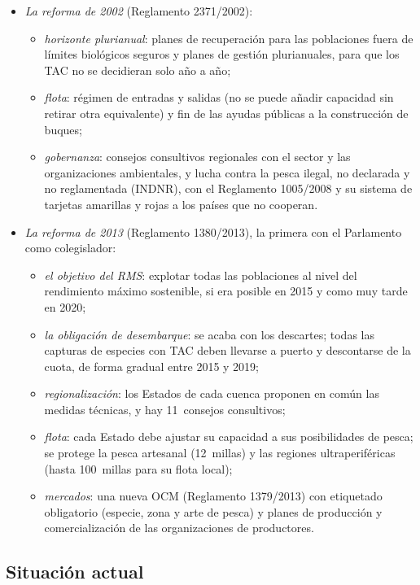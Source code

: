 \documentclass[11pt]{article}
\begin{document}
\begin{itemize}
\item \emph{La reforma de 2002} (Reglamento 2371/2002)\nocite{UE2002PPC}:
  \begin{itemize}
  \item \emph{horizonte plurianual}: planes de recuperación para las poblaciones fuera de límites biológicos seguros y planes de gestión plurianuales, para que los TAC no se decidieran solo año a año;
  \item \emph{flota}: régimen de entradas y salidas (no se puede añadir capacidad sin retirar otra equivalente) y fin de las ayudas públicas a la construcción de buques;
  \item \emph{gobernanza}: consejos consultivos regionales con el sector y las organizaciones ambientales, y lucha contra la pesca ilegal, no declarada y no reglamentada (INDNR), con el Reglamento 1005/2008 y su sistema de tarjetas amarillas y rojas a los países que no cooperan.
  \end{itemize}
\item \emph{La reforma de 2013} (Reglamento 1380/2013), la primera con el Parlamento como colegislador\nocite{UE2013PPC}:
  \begin{itemize}
  \item \emph{el objetivo del RMS}: explotar todas las poblaciones al nivel del rendimiento máximo sostenible, si era posible en 2015 y como muy tarde en 2020;
  \item \emph{la obligación de desembarque}: se acaba con los descartes; todas las capturas de especies con TAC deben llevarse a puerto y descontarse de la cuota, de forma gradual entre 2015 y 2019;
  \item \emph{regionalización}: los Estados de cada cuenca proponen en común las medidas técnicas, y hay 11~consejos consultivos;
  \item \emph{flota}: cada Estado debe ajustar su capacidad a sus posibilidades de pesca; se protege la pesca artesanal (12~millas) y las regiones ultraperiféricas (hasta 100~millas para su flota local);
  \item \emph{mercados}: una nueva OCM (Reglamento 1379/2013) con etiquetado obligatorio (especie, zona y arte de pesca) y planes de producción y comercialización de las organizaciones de productores.
  \end{itemize}
\end{itemize}

\subsection{Situación actual}\label{sec:ppc-actual}
\end{document}
